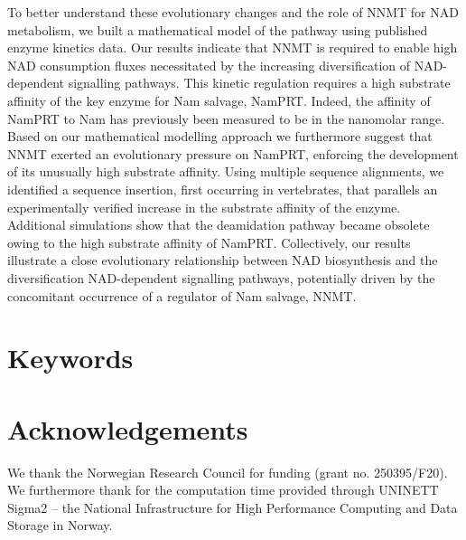\documentclass[paper=a4, 12pt]{scrartcl}
\begin{document}
To better understand these evolutionary changes and the role of NNMT for NAD metabolism, we built a mathematical model of the pathway using published enzyme kinetics data. Our results indicate that NNMT is required to enable high NAD consumption fluxes necessitated by the increasing diversification of NAD-dependent signalling pathways. This kinetic regulation requires a high substrate affinity of the key enzyme for Nam salvage, NamPRT. Indeed, the affinity of NamPRT to Nam has previously been measured to be in the nanomolar range. Based on our mathematical modelling approach we furthermore suggest that NNMT exerted an evolutionary pressure on NamPRT, enforcing the development of its unusually high substrate affinity. Using multiple sequence alignments, we identified a sequence insertion, first occurring in vertebrates, that parallels an experimentally verified increase in the substrate affinity of the enzyme. Additional simulations show that the deamidation pathway became obsolete owing to the high substrate affinity of NamPRT. Collectively, our results illustrate a close evolutionary relationship between NAD biosynthesis and the diversification NAD-dependent signalling pathways, potentially driven by the concomitant occurrence of a regulator of Nam salvage, NNMT.


\section*{Keywords}

















\section*{Acknowledgements}

We thank the Norwegian Research Council for funding (grant no. 250395/F20). We furthermore thank for the computation time provided through UNINETT Sigma2 – the National Infrastructure for High Performance Computing and Data Storage in Norway.
\end{document}
